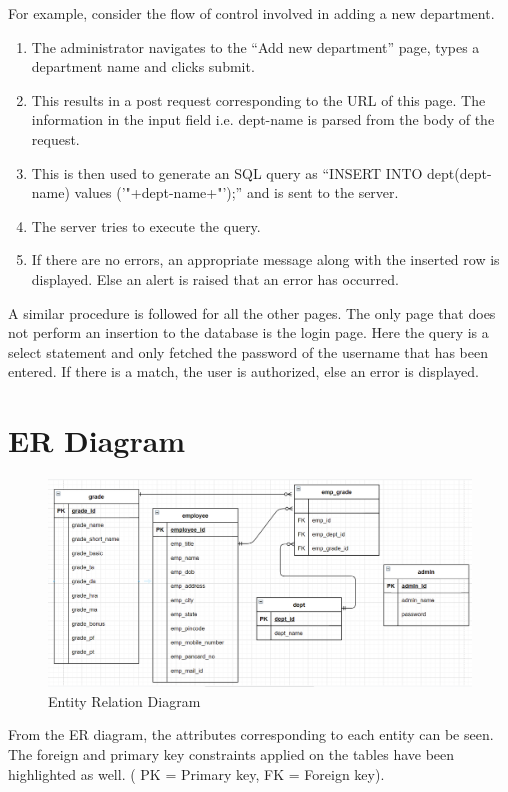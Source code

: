 \documentclass[12pt]{article}
\begin{document}
\newline
\newline
For example, consider the flow of control involved in adding a new department. 
\begin{enumerate}
    \item The administrator navigates to the “Add new department” page, types a department name and clicks submit.
    \item This results in a post request corresponding to the URL of this page. The information in the input field i.e. dept-name is parsed from the body of the request.
    \item This is then used to generate an SQL query as “INSERT INTO dept(dept-name) values ('"+dept-name+"');” and is sent to the server.
    \item The server tries to execute the query.
    \item If there are no errors, an appropriate message along with the inserted row is displayed. Else an alert is raised that an error has occurred.
\end{enumerate}
A similar procedure is followed for all the other pages. The only page that does not perform an insertion to the database is the login page. Here the query is a select statement and only fetched the password of the username that has been entered. If there is a match, the user is authorized, else an error is displayed.


\newpage                %
\section{ER Diagram}    %

\begin{figure}[h!]
    \centering
    \includegraphics[width = \columnwidth]{er_diagram.png}
    \caption{Entity Relation Diagram}
    \label{fig:my_label}
\end{figure}
\noindent
From the ER diagram, the attributes corresponding to each entity can be seen. The foreign and primary key constraints applied on the tables have been highlighted as well. ( PK = Primary key, FK = Foreign key).
\end{document}
